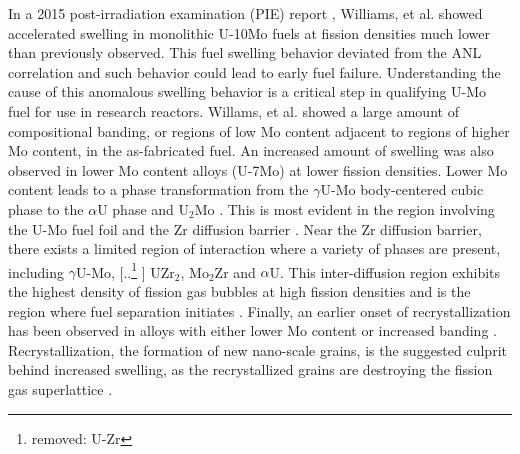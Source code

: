 \documentclass[review]{elsarticle}
\providecommand{\DIFaddtex}[1]{{\protect\color{blue} \sf #1}} %
\providecommand{\DIFdeltex}[1]{{\protect\color{red} [..\footnote{removed: #1} ]}} %
\providecommand{\DIFaddbegin}{} %
\providecommand{\DIFaddend}{} %
\providecommand{\DIFdelbegin}{} %
\providecommand{\DIFdelend}{} %
\providecommand{\DIFadd}[1]{\texorpdfstring{\DIFaddtex{#1}}{#1}} %
\providecommand{\DIFdel}[1]{\texorpdfstring{\DIFdeltex{#1}}{}} %
\newcommand{\DIFscaledelfig}{0.5}
\newlength{\DIFdelgraphicswidth} %
\newlength{\DIFdelgraphicsheight} %
\newcommand{\DIFaddincludegraphics}[2][]{{\color{blue}\fbox{\DIFOincludegraphics[#1]{#2}}}} %
\newcommand{\DIFdelincludegraphics}[2][]{%
\sbox{\DIFdelgraphicsbox}{\DIFOincludegraphics[#1]{#2}}%
\settoboxwidth{\DIFdelgraphicswidth}{\DIFdelgraphicsbox} %
\settoboxtotalheight{\DIFdelgraphicsheight}{\DIFdelgraphicsbox} %
\scalebox{\DIFscaledelfig}{%
\parbox[b]{\DIFdelgraphicswidth}{\usebox{\DIFdelgraphicsbox}\\[-\baselineskip] \rule{\DIFdelgraphicswidth}{0em}}\llap{\resizebox{\DIFdelgraphicswidth}{\DIFdelgraphicsheight}{%
\setlength{\unitlength}{\DIFdelgraphicswidth}%
\begin{picture}(1,1)%
\thicklines\linethickness{2pt} %
{\color[rgb]{1,0,0}\put(0,0){\framebox(1,1){}}}%
{\color[rgb]{1,0,0}\put(0,0){\line( 1,1){1}}}%
{\color[rgb]{1,0,0}\put(0,1){\line(1,-1){1}}}%
\end{picture}%
}\hspace*{3pt}}} %
} %
\DeclareRobustCommand{\DIFaddbegin}{\DIFOaddbegin \let\includegraphics\DIFaddincludegraphics} %
\DeclareRobustCommand{\DIFaddend}{\DIFOaddend \let\includegraphics\DIFOincludegraphics} %
\DeclareRobustCommand{\DIFdelbegin}{\DIFOdelbegin \let\includegraphics\DIFdelincludegraphics} %
\DeclareRobustCommand{\DIFdelend}{\DIFOaddend \let\includegraphics\DIFOincludegraphics} %
\begin{document}
In a 2015 post-irradiation examination (PIE) report \cite{afip6report}, Williams, et al. showed accelerated swelling in monolithic U-10Mo fuels at fission densities much lower than previously observed. This fuel swelling behavior deviated from the ANL correlation and such behavior could lead to early fuel failure. Understanding the cause of this anomalous swelling behavior is a critical step in qualifying U-Mo fuel for use in research reactors. Willams, et al. \cite{afip6report} showed a large amount of compositional banding, or regions of low Mo content adjacent to regions of higher Mo content, in the as-fabricated fuel. An increased amount of swelling was also observed in lower Mo content alloys (U-7Mo) \cite{vandenberghe2014} at lower fission densities. Lower Mo content leads to \DIFaddbegin \DIFadd{a }\DIFaddend phase transformation from the $\gamma$U-Mo body-centered cubic phase to the $\alpha$U phase and U$_{2}$Mo \cite{janfong2014}. This is most evident in the region involving the U-Mo fuel foil and the Zr diffusion barrier \cite{park2015}. Near the Zr diffusion barrier, there exists a limited region of interaction where a variety of phases are present, including $\gamma$U-Mo, \DIFdelbegin \DIFdel{U-Zr}\DIFdelend \DIFaddbegin \DIFadd{UZr}\DIFaddend $_{2}$, Mo$_{2}$Zr and $\alpha$U. This inter-diffusion region exhibits the highest density of fission gas bubbles at high fission densities and is the region where fuel separation initiates \cite{rertr12}. Finally, an earlier onset of recrystallization has been observed in alloys with either lower Mo content or increased banding \cite{kim2013A}. Recrystallization, the formation of new nano-scale grains, is the suggested culprit behind increased swelling, as the recrystallized grains are destroying the fission gas superlattice \cite{vandenberghe2008}. 
\end{document}
